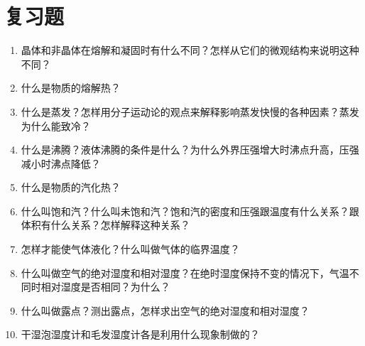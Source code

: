 \section*{复习题}
\begin{enumerate}

	\item 晶体和非晶体在熔解和凝固时有什么不同？怎样从它们的微观结构来说明这种不同？
	\item 什么是物质的熔解热？
		\item 什么是蒸发？怎样用分子运动论的观点来解释影响蒸发快慢的各种因素？蒸发为什么能致冷？
	\item 什么是沸腾？液体沸腾的条件是什么？为什么外界压强增大时沸点升高，压强减小时沸点降低？
	\item 什么是物质的汽化热？
	\item 什么叫饱和汽？什么叫未饱和汽？饱和汽的密度和压强跟温度有什么关系？跟体积有什么关系？怎样解释这种关系？
	\item 怎样才能使气体液化？什么叫做气体的临界温度？
	\item 什么叫做空气的绝对湿度和相对湿度？在绝时湿度保持不变的情况下，气温不同时相对湿度是否相同？为什么？
	\item 什么叫做露点？测出露点，怎样求出空气的绝对湿度和相对湿度？
	\item 干湿泡湿度计和毛发湿度计各是利用什么现象制做的？
\end{enumerate}
